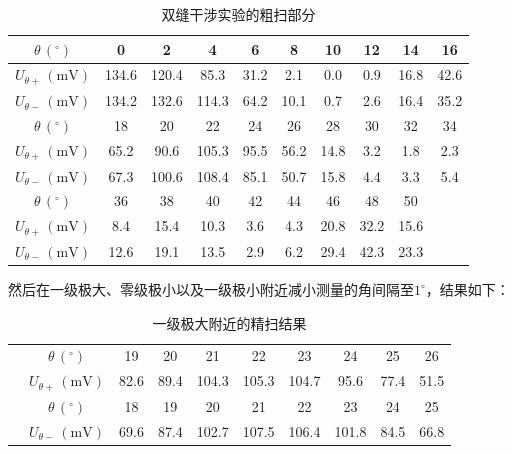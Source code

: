 \documentclass[12pt]{article}
\begin{document}
\begin{table}[htbp]
    \centering
    \begin{tabular}{|c|c|c|c|c|c|c|c|c|c|}
    \hline
    $\theta\,(^\circ)$            & 0     & 2     & 4     & 6    & 8    & 10   & 12   & 14   & 16   \\ \hline
    $U_{\theta +}\,(\mathrm{mV})$ & 134.6 & 120.4 & 85.3  & 31.2 & 2.1  & 0.0  & 0.9  & 16.8 & 42.6 \\ \hline
    $U_{\theta -}\,(\mathrm{mV})$ & 134.2 & 132.6 & 114.3 & 64.2 & 10.1 & 0.7  & 2.6  & 16.4 & 35.2 \\ \hline
    $\theta\,(^\circ)$            & 18    & 20    & 22    & 24   & 26   & 28   & 30   & 32   & 34   \\ \hline
    $U_{\theta +}\,(\mathrm{mV})$ & 65.2  & 90.6  & 105.3 & 95.5 & 56.2 & 14.8 & 3.2  & 1.8  & 2.3  \\ \hline
    $U_{\theta -}\,(\mathrm{mV})$ & 67.3  & 100.6 & 108.4 & 85.1 & 50.7 & 15.8 & 4.4  & 3.3  & 5.4  \\ \hline
    $\theta\,(^\circ)$            & 36    & 38    & 40    & 42   & 44   & 46   & 48   & 50   &      \\ \hline
    $U_{\theta +}\,(\mathrm{mV})$ & 8.4   & 15.4  & 10.3  & 3.6  & 4.3  & 20.8 & 32.2 & 15.6 &      \\ \hline
    $U_{\theta -}\,(\mathrm{mV})$ & 12.6  & 19.1  & 13.5  & 2.9  & 6.2  & 29.4 & 42.3 & 23.3 &      \\ \hline
    \end{tabular}
    \caption{双缝干涉实验的粗扫部分}
\end{table}

然后在一级极大、零级极小以及一级极小附近减小测量的角间隔至$1^\circ$，结果如下：

\begin{table}[htbp]
    \centering
    \begin{tabular}{|c|c|c|c|c|c|c|c|c|c|}
    \hline
     & $\theta\,(^\circ)$            & 19   & 20   & 21    & 22    & 23    & 24    & 25   & 26   \\  
                          & $U_{\theta +}\,(\mathrm{mV})$ & 82.6 & 89.4 & 104.3 & 105.3 & 104.7 & 95.6  & 77.4 & 51.5 \\  
                          & $\theta\,(^\circ)$            & 18   & 19   & 20    & 21    & 22    & 23    & 24   & 25   \\  
                          & $U_{\theta -}\,(\mathrm{mV})$ & 69.6 & 87.4 & 102.7 & 107.5 & 106.4 & 101.8 & 84.5 & 66.8 \\ \hline
    \end{tabular}
    \caption{一级极大附近的精扫结果}
\end{table}
\end{document}
